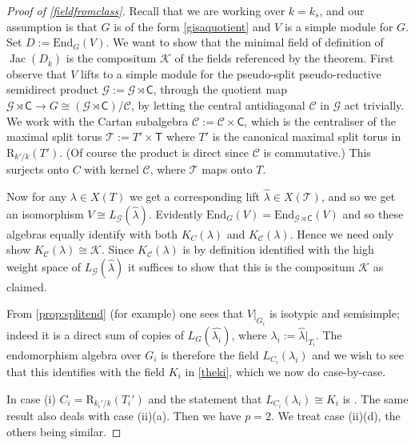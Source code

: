\documentclass[11pt,reqno]{amsart}
\theoremstyle{definition}
\theoremstyle{remark}
\theoremstyle{definition}
\theoremstyle{plain}
\DeclareMathOperator{\Jac}{Jac}
\newcommand{\R}{\mathrm{R}}
\newcommand{\G}{\mathscr{G}}
\newcommand{\GG}{\mathcal{G}}
\newcommand{\TT}{\mathcal{T}}
\newcommand{\End}{\mathrm{End}}
\newcommand{\Gm}{\mathbb{G}_m}
\newcommand{\KK}{\mathcal{K}}
\newcommand{\Cs}{\mathsf{C}}
\newcommand{\Ts}{\mathsf{T}}
\newcommand{\CCC}{\mathcal{C}}
\newcommand{\C}{\mathscr{C}}
\newcommand{\bark}{{\overline{k}}}
\begin{document}
\begin{proof}[Proof of \cref{fieldfromclass}]
Recall that we are working over $k=k_s$, and our assumption is that $G$ is of the form \cref{gisaquotient} and $V$ is a simple module for $G$. Set $D:=\End_G(V)$. We want to show that the minimal field of definition of $\Jac(D_\bark)$ is the compositum $\mathcal{K}$ of the fields referenced by the theorem. 
First observe that $V$ lifts to a simple module for the pseudo-split pseudo-reductive  semidirect product $\GG:=\G\rtimes\Cs$, through the quotient map $\G\rtimes\Cs\to G\cong(\G\rtimes\Cs)/\C$, by letting the central antidiagonal $\C$ in $\GG$ act trivially. We work with the Cartan subalgebra $\CCC:=\C\times\Cs$, which is the centraliser of the maximal split torus $\TT:=T'\times \Ts$ where $T'$ is the canonical maximal split torus in $\R_{k'/k}(T')$. (Of course the product is direct since $\CCC$ is commutative.) This surjects onto $C$ with kernel $\C$, where $\TT$ maps onto $T$. 

Now for any $\lambda\in X(T)$ we get a corresponding lift $\widehat{\lambda}\in X(\TT)$, and so we get an isomorphism $V\cong L_{\G}(\widehat\lambda)$. Evidently $\End_G(V)=\End_{\G\rtimes\Cs}(V)$ and so these algebras equally identify with both $K_C(\lambda)$ and $K_\CCC(\lambda)$. Hence we need only show $K_\CCC(\lambda)\cong\KK$. Since $K_\CCC(\lambda)$ is by definition identified with the high weight space of $L_\GG(\widehat{\lambda})$ it suffices to show that this is the compositum $\KK$ as claimed. 

From \cref{prop:splitend} (for example) one sees that $V|_{G_i}$ is isotypic and semisimple; indeed it is a direct sum of copies of $L_G(\widehat{\lambda_i})$, where $\lambda_i:=\widehat{\lambda}|_{T_i}$. The  endomorphism algebra over $G_i$ is therefore the field $L_{C_i}(\lambda_i)$ and we wish to see that this identifies with the field $K_i$ in \cref{theki}, which we now do case-by-case. 

In case (i) $C_i=\R_{k_i'/k}(T_i')$ and the statement that $L_{C_i}(\lambda_i)\cong K_i$ is \cite[Thm.~5.8]{BS22}. The same result also deals with case (ii)(a).  Then we have $p=2$. We treat case (ii)(d), the others being similar. 



\end{proof}
\end{document}
